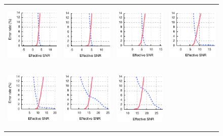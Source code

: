 \begin{figure}[p]
\begin{xtrafullpage}
\begin{tabular}{cccc}
	\midrule
	\includegraphics[height=1.2in]{figures/delivery/goodbad/esnr_goodbad_8.pdf} &
	\includegraphics[height=1.2in]{figures/delivery/goodbad/esnr_goodbad_9.pdf} &
	\includegraphics[height=1.2in]{figures/delivery/goodbad/esnr_goodbad_10.pdf} &
	\includegraphics[height=1.2in]{figures/delivery/goodbad/esnr_goodbad_11.pdf} \\
	\includegraphics[height=1.2in]{figures/delivery/goodbad/esnr_goodbad_12.pdf} &
	\includegraphics[height=1.2in]{figures/delivery/goodbad/esnr_goodbad_13.pdf} &
	\includegraphics[height=1.2in]{figures/delivery/goodbad/esnr_goodbad_14.pdf} &

\end{tabular}
\end{xtrafullpage}
\end{figure}
